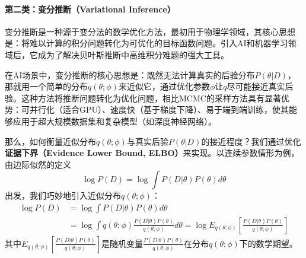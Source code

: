 \paragraph{第二类：变分推断（Variational Inference）}


变分推断是一种源于变分法的数学优化方法，最初用于物理学领域，其核心思想是：将难以计算的积分问题转化为可优化的目标函数问题。引入AI和机器学习领域后，它成为了解决贝叶斯推断中高维积分难题的强大工具。

在AI场景中，变分推断的核心思想是：既然无法计算真实的后验分布$P(\theta|D)$，那就用一个简单的分布$q(\theta;\phi)$来近似它，通过优化参数$\phi$让$q$尽可能接近真实后验。这种方法将推断问题转化为优化问题，相比MCMC的采样方法具有显著优势：可并行化（适合GPU）、速度快（基于梯度下降）、易于端到端训练，使其能够应用于超大规模数据集和复杂模型（如深度神经网络）。

那么，如何衡量近似分布$q(\theta;\phi)$与真实后验$P(\theta|D)$的接近程度？我们通过优化\textbf{证据下界（Evidence Lower Bound, ELBO）}来实现。以连续参数情形为例，由边际似然的定义
$$\log P(D) = \log \int P(D|\theta)P(\theta)d\theta$$
出发，我们巧妙地引入近似分布$q(\theta;\phi)$：
\begin{align}\label{eq1}
\log P(D) &= \log \int P(D|\theta)P(\theta)d\theta \nonumber \\
          &= \log \int q(\theta;\phi)\frac{P(D|\theta)P(\theta)}{q(\theta;\phi)}d\theta  =   \log {E}_{q(\theta;\phi)}\left[\frac{P(D|\theta)P(\theta)}{q(\theta;\phi)}\right]
\end{align}
其中$E_{q(\theta;\phi)}\left[\frac{P(D|\theta)P(\theta)}{q(\theta;\phi)}\right]$是随机变量$\frac{P(D|\theta)P(\theta)}{q(\theta;\phi)}$在分布$q(\theta;\phi)$下的数学期望。

